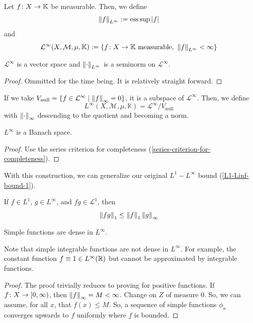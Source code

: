 \documentclass[11pt,leqno,oneside]{amsbook}
\numberwithin{thm}{section}
\newcommand{\M}{\mathcal{M}} %
\newcommand{\cL}{\mathcal{L}}
\newcommand{\K}{\mathbb{K}} %
\newcommand{\ess}{\operatorname{ess}}
\begin{document}
\begin{defn}
  Let \(f \from X \to \K\) be measurable. Then, we define \[
    \norm[f]_{L^\infty} := \ess \sup |f|
  \]
  and \[\cL^\infty(X,\M,\mu,\K) := \{f \from X \to \K \text{
      measurable},\ \norm[f]_{L^\infty} < \infty\}\]
\end{defn}
\begin{prop}
  \(\cL^\infty\) is a vector space and \(\norm_{L^\infty}\) is a
  seminorm on \(\cL^\infty\).
\end{prop}
\begin{proof}
  Ommitted for the time being. It is relatively straight forward.
\end{proof}
\begin{defn}
  If we take \(V_\text{null} = \{f \in \cL^\infty \st \norm[f]_\infty
  = 0\}\), it is a subspace of \(\cL^\infty\). Then, we define \[
    L^\infty(X,\M,\mu,\K) = \cL^\infty / V_\text{null}
  \]
  with \(\norm_\infty\) descending to the quotient and becoming a norm.
\end{defn}
\begin{thm}
  \(L^\infty\) is a Banach space.
\end{thm}
\begin{proof}
  Use the series criterion for completeness
  (\ref{series-criterion-for-completeness}).
\end{proof}
With this construction, we can generalize our original
\(L^1-L^\infty\) bound (\ref{L1-Linf-bound-1}).
\begin{prop}
  If \(f \in L^1\), \(g \in L^\infty\), and \(fg \in \cL^1\), then \[
    \norm[fg]_1 \leq \norm[f]_1 \norm[g]_\infty
  \]
\end{prop}
\begin{thm}
  Simple functions are dense in \(L^\infty\).
\end{thm}
\begin{rmk}
  Note that simple integrable functions are not dense in
  \(L^\infty\). For example, the constant function \(f \equiv 1 \in
  L^\infty(\R)\) but cannot be approximated by integrable functions.
\end{rmk}
\begin{proof}
  The proof trivially reduces to proving for positive functions. If
  \(f \from X \to [0,\infty)\), then \(\norm[f]_\infty = M <
  \infty\). Change on \(Z\) of measure 0. So, we can assume, for all
  \(x\), that \(f(x) \leq M\). So, a sequence of simple functions
  \(\phi_n\) converges upwards to \(f\) uniformly where \(f\) is bounded.
\end{proof}
\end{document}
